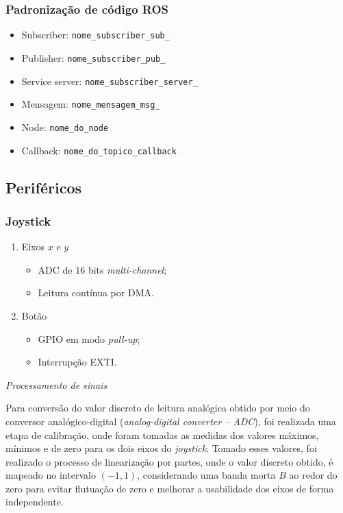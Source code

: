 \subsubsection*{Padronização de código ROS}
	
	\begin{itemize}
		\item Subscriber: \texttt{nome\_subscriber\_sub\_}
		\item Publisher: \texttt{nome\_subscriber\_pub\_}
		\item Service server: \texttt{nome\_subscriber\_server\_}
		\item Mensagem: \texttt{nome\_mensagem\_msg\_}
		\item Node: \texttt{nome\_do\_node}
		\item Callback: \texttt{nome\_do\_topico\_callback}
		
	\end{itemize}

\subsection{Periféricos}

\subsubsection*{Joystick}

\begin{enumerate}
	\item Eixos $x$ e $y$
	\begin{itemize}
		\item ADC de 16 bits \textit{multi-channel};
		\item Leitura contínua por DMA.					
	\end{itemize}
	
	\item Botão
	\begin{itemize}
		\item GPIO em modo \textit{pull-up};
		\item Interrupção EXTI.
		
	\end{itemize}

\end{enumerate}

\noindent \textit{Processamento de sinais}

Para conversão do valor discreto de leitura analógica obtido por meio do conversor analógico-digital (\textit{analog-digital converter -- ADC}), foi realizada uma etapa de calibração, onde foram tomadas as medidas dos valores máximos, mínimos e de zero para os dois eixos do \textit{joystick}. Tomado esses valores, foi realizado o processo de linearização por partes, onde o valor discreto obtido, é mapeado no intervalo $(-1, 1)$, considerando uma banda morta $B$ ao redor do zero para evitar flutuação de zero e melhorar a usabilidade dos eixos de forma independente.

